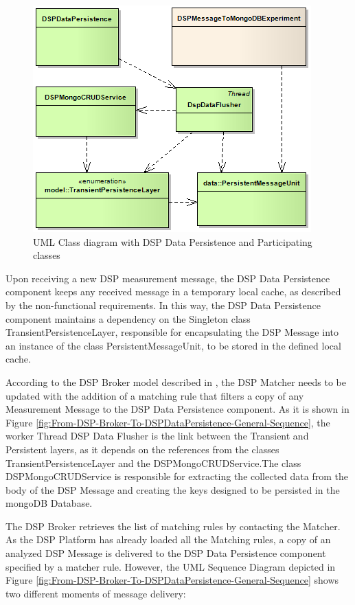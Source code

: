 \begin{figure}[!h]
  \centering
  \includegraphics[scale=0.65]{../diagrams/DSP-DataPersistence-Flusher-Classes}
  \caption{UML Class diagram with DSP Data Persistence and Participating classes}
  \label{fig:DSP-DataPersistence-Flusher-Classes}
\end{figure}

Upon receiving a new DSP measurement message, the DSP Data Persistence
component keeps any received message in a temporary local cache, as described 
by the non-functional requirements. In this way, the DSP Data Persistence 
component maintains a dependency on the Singleton class TransientPersistenceLayer, 
responsible for encapsulating the DSP Message into an instance of the class 
PersistentMessageUnit, to be stored in the defined local cache.

According to the DSP Broker model described in \cite{netbeams-dsp-architecture}, 
the DSP Matcher needs to be updated with the addition of a matching rule that
filters a copy of any Measurement Message to the DSP Data Persistence component. 
As it is shown in Figure
\ref{fig:From-DSP-Broker-To-DSPDataPersistence-General-Sequence}, the worker
Thread DSP Data Flusher is the link between the Transient and Persistent
layers, as it depends on the references from the classes
TransientPersistenceLayer and the DSPMongoCRUDService.The class
DSPMongoCRUDService is responsible for extracting the collected data from the
body of the DSP Message and creating the keys designed to be persisted
in the mongoDB Database.

The DSP Broker retrieves the list of matching rules by contacting the Matcher.
As the DSP Platform has already loaded all the Matching rules, a copy of an
analyzed DSP Message is delivered to the DSP Data Persistence component specified
by a matcher rule. However, the UML Sequence Diagram depicted in Figure 
\ref{fig:From-DSP-Broker-To-DSPDataPersistence-General-Sequence} shows two 
different moments of message delivery:

